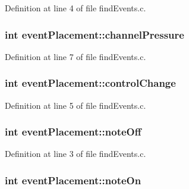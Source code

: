 Definition at line 4 of file find\+Events.\+c.

\hypertarget{structevent_placement_aa862fb0adf136bad91e493ae93a703bb}{
\subsubsection[{channel\+Pressure}]{\setlength{\rightskip}{0pt plus 5cm}int event\+Placement\+::channel\+Pressure}}\label{structevent_placement_aa862fb0adf136bad91e493ae93a703bb}


Definition at line 7 of file find\+Events.\+c.

\hypertarget{structevent_placement_aa4a1d84f7b34a1c3f193a940de8e0aab}{
\subsubsection[{control\+Change}]{\setlength{\rightskip}{0pt plus 5cm}int event\+Placement\+::control\+Change}}\label{structevent_placement_aa4a1d84f7b34a1c3f193a940de8e0aab}


Definition at line 5 of file find\+Events.\+c.

\hypertarget{structevent_placement_a3466f6aaaf7efc6fd7fc31f4fe41c11a}{
\subsubsection[{note\+Off}]{\setlength{\rightskip}{0pt plus 5cm}int event\+Placement\+::note\+Off}}\label{structevent_placement_a3466f6aaaf7efc6fd7fc31f4fe41c11a}


Definition at line 3 of file find\+Events.\+c.

\hypertarget{structevent_placement_afda36632eb365d3abc4a44d17fd42f89}{
\subsubsection[{note\+On}]{\setlength{\rightskip}{0pt plus 5cm}int event\+Placement\+::note\+On}}\label{structevent_placement_afda36632eb365d3abc4a44d17fd42f89}



